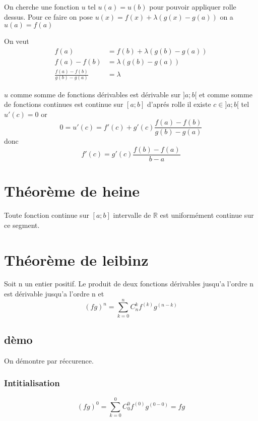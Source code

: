 \documentclass[a4paper,10pt]{article}
\begin{document}
On cherche une fonction $u$ tel $u(a) = u(b)$ pour pouvoir appliquer rolle dessus. Pour ce faire on pose
$u(x) = f(x) + \lambda (g(x) - g(a))$
on a $u(a) = f(a)$



On veut
\begin{align*}
f(a) &= f(b) + \lambda(g(b) - g(a))\\
f(a) - f(b) &= \lambda(g(b) - g(a))\\
\frac{f(a) - f(b)}{g(b) - g(a)} &= \lambda
\end{align*}

$u$ comme somme de fonctions dérivables est dérivable sur $]a;b[$ et comme somme de fonctions continues est continue sur $[a;b]$
d'aprés rolle il existe $c \in ]a;b[$ tel $u'(c) = 0$ or
\[0 = u'(c) = f'(c) + g'(c)\frac{f(a) - f(b)}{g(b) - g(a)}\]
donc \[f'(c) = g'(c)\frac{f(b) - f(a)}{b - a}\]







\section{Théorème de heine}
Toute fonction continue sur $[a;b]$ intervalle de $\mathbb{R}$ est uniformément continue sur ce segment.
\section{Théorème de leibinz}
Soit n un entier positif. Le produit de deux fonctions dérivables jusqu'a l'ordre n est dérivable jusqu'a l'ordre n et
\[(fg)^{n} = \sum_{k = 0}^{n}C^{k}_{n}f^{(k)}g^{(n-k)}\]
\subsection{dèmo}
On démontre par réccurence.
\subsubsection[cela marche pas]{Intitialisation}
\[(fg)^{0} = \sum_{k = 0}^{0}C^{0}_{0}f^{(0)}g^{(0-0)} = fg\]
\end{document}
